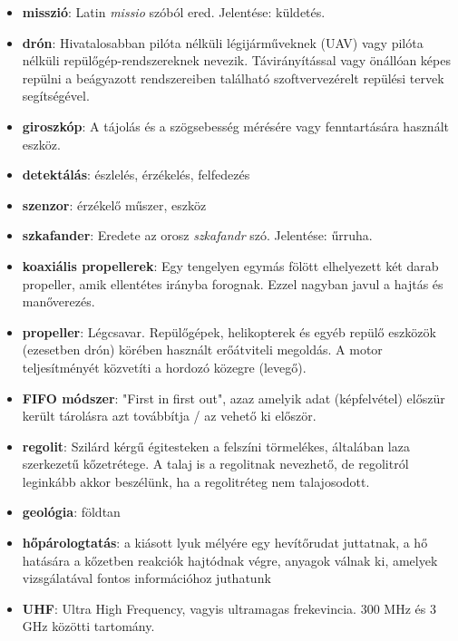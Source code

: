 \documentclass[12pt]{report}
\begin{document}
\begin{itemize}

  \item \textbf{misszió}: Latin \textit{missio} szóból ered. Jelentése: küldetés.
  \item \textbf{drón}: Hivatalosabban pilóta nélküli légijárműveknek (UAV) vagy pilóta nélküli repülőgép-rendszereknek nevezik. Távirányítással vagy önállóan képes repülni a beágyazott rendszereiben található szoftvervezérelt repülési tervek segítségével.
  \item \textbf{giroszkóp}: A tájolás és a szögsebesség mérésére vagy fenntartására használt eszköz.
  \item \textbf{detektálás}: észlelés, érzékelés, felfedezés
  \item \textbf{szenzor}: érzékelő műszer, eszköz
  \item \textbf{szkafander}: Eredete az orosz \textit{szkafandr} szó. Jelentése: űrruha.
  \item \textbf{koaxiális propellerek}: Egy tengelyen egymás fölött elhelyezett két darab propeller, amik ellentétes irányba forognak. Ezzel nagyban javul a hajtás és manőverezés.
  \item \textbf{propeller}: Légcsavar. Repülőgépek, helikopterek és egyéb repülő eszközök (ezesetben drón) körében használt erőátviteli megoldás. A motor teljesítményét közvetíti a hordozó közegre (levegő).
  \item \textbf{FIFO módszer}: "First in first out", azaz amelyik adat (képfelvétel) előszür került tárolásra azt továbbítja / az vehető ki először.
  \item \textbf{regolit}: Szilárd kérgű égitesteken a felszíni törmelékes, általában laza szerkezetű kőzetrétege. A talaj is a regolitnak nevezhető, de regolitról leginkább akkor beszélünk, ha a regolitréteg nem talajosodott.
  \item \textbf{geológia}: földtan
  \item \textbf{hőpárologtatás}: a kiásott lyuk mélyére egy hevítőrudat juttatnak, a hő hatására a kőzetben reakciók hajtódnak végre, anyagok válnak ki, amelyek vizsgálatával fontos információhoz juthatunk
  \item \textbf{UHF}: Ultra High Frequency, vagyis ultramagas frekevincia. 300 MHz és 3 GHz közötti tartomány.
\end{itemize}
\end{document}
